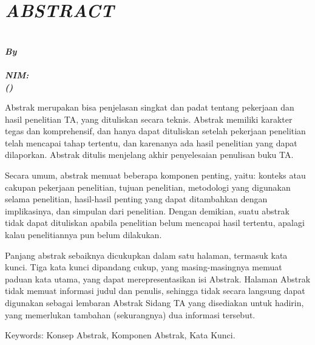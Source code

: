 \chapter{\itshape ABSTRACT}
\label{chp:abstract}
\vspace{\baselineskip}
\begin{center}
  \bfseries\large\itshape
  \MakeUppercase{\titlename} \\
  \vspace{1\baselineskip}
  \normalsize\normalfont\itshape By \\
  \normalfont\bfseries\large \authorname \\
  NIM: \authorid \\
  (\itshape\department) \\
\end{center}
\itshape
\vspace{2\baselineskip}

Abstrak merupakan bisa penjelasan singkat dan padat tentang pekerjaan dan hasil penelitian TA, yang dituliskan secara teknis. Abstrak memiliki karakter tegas dan komprehensif, dan hanya dapat dituliskan setelah pekerjaan penelitian telah mencapai tahap tertentu, dan karenanya ada hasil penelitian yang dapat dilaporkan. Abstrak ditulis menjelang akhir penyelesaian penulisan buku TA.
\vspace{\baselineskip}

\indent Secara umum, abstrak memuat beberapa komponen penting, yaitu: konteks atau cakupan pekerjaan penelitian, tujuan penelitian, metodologi yang digunakan selama penelitian, hasil-hasil penting yang dapat ditambahkan dengan implikasinya, dan simpulan dari penelitian. Dengan demikian, suatu abstrak tidak dapat dituliskan apabila penelitian belum mencapai hasil tertentu, apalagi kalau penelitiannya pun belum dilakukan.
\vspace{\baselineskip}

Panjang abstrak sebaiknya dicukupkan dalam satu halaman, termasuk kata kunci. Tiga kata kunci dipandang cukup, yang masing-masingnya memuat paduan kata utama, yang dapat merepresentasikan isi Abstrak. Halaman Abstrak tidak memuat informasi judul dan penulis, sehingga tidak secara langsung dapat digunakan sebagai lembaran Abstrak Sidang TA yang disediakan untuk hadirin, yang memerlukan tambahan (sekurangnya) dua informasi tersebut.

\begin{flushleft}
  Keywords: Konsep Abstrak, Komponen Abstrak, Kata Kunci.
\end{flushleft}\normalfont